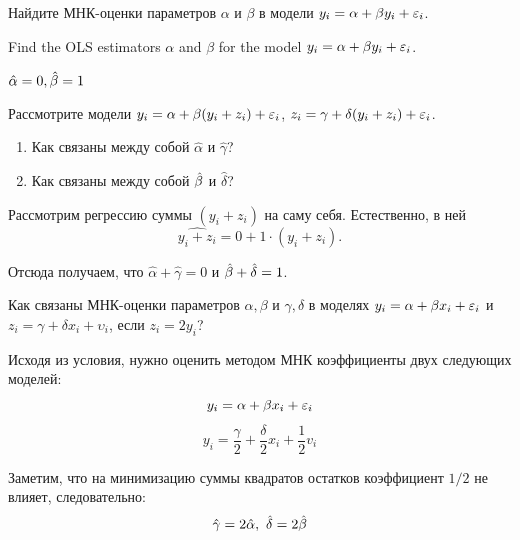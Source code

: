 \begin{problem}
\begin{translation-ru}
    Найдите МНК-оценки параметров $\alpha$ и $\beta$ в модели $y_i = \alpha + \beta y_i + \varepsilon_i$.    
\end{translation-ru}
\begin{translation-en}
    Find the OLS estimators $\alpha$ and $\beta$ for the model $y_i = \alpha + \beta y_i + \varepsilon_i$.    
\end{translation-en}

\begin{sol}
$\hat{\alpha} = 0,  \hat{\beta} = 1$
\end{sol}
\end{problem}


\begin{problem}
Рассмотрите модели $y_i = \alpha + \beta (y_i + z_i) + \varepsilon_i$, $z_i = \gamma + \delta(y_i+z_i) + \varepsilon_i$.
\begin{enumerate}
\item Как связаны между собой $\hat{\alpha}$ и $\hat{\gamma}$?
\item Как связаны между собой $\hat{\beta}$ и $\hat{\delta}$?
\end{enumerate}


\begin{sol} %
Рассмотрим регрессию суммы $(y_i + z_i)$ на саму себя. Естественно, в ней
\[
\widehat{y_i + z_i} = 0 + 1 \cdot (y_i + z_i).
\]

Отсюда получаем, что $\hat{\alpha} + \hat{\gamma} = 0$ и $\hat{\beta} + \hat{\delta} = 1$.
\end{sol}
\end{problem}




\begin{problem}
Как связаны МНК-оценки параметров $\alpha, \beta$ и $\gamma, \delta$ в моделях $y_i = \alpha + \beta x_i + \varepsilon_i$ и $z_i = \gamma + \delta x_i + \upsilon_i$, если $z_i = 2 y_i$?


\begin{sol}

Исходя из условия, нужно оценить методом МНК коэффициенты двух следующих моделей:
\[y_i = \alpha + \beta x_i + \varepsilon_i \]
\[y_i = \frac{\gamma}{2} + \frac{\delta}{2} x_i + \frac{1}{2} v_i \]

Заметим, что на минимизацию суммы квадратов остатков коэффициент \(1/2\) не влияет, следовательно:
\[\hat{\gamma} = 2\hat{\alpha}, \ \hat{\delta} = 2 \hat{\beta}  \]

\end{sol}
\end{problem}


